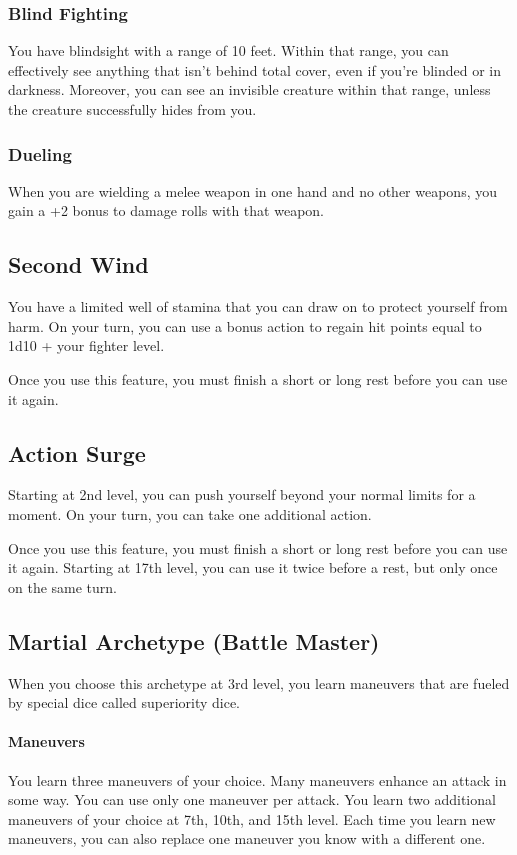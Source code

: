 {\subsubsection*{Blind Fighting}
You have blindsight with a range of 10 feet. Within that range, you can effectively see anything that isn't behind total cover, even if you're blinded or in darkness. Moreover, you can see an invisible creature within that range, unless the creature successfully hides from you.
\subsubsection*{Dueling}
When you are wielding a melee weapon in one hand and no other weapons, you gain a +2 bonus to damage rolls with that weapon.
\subsection*{Second Wind}
You have a limited well of stamina that you can draw on to protect yourself from harm. On your turn, you can use a bonus action to regain hit points equal to 1d10 + your fighter level.

Once you use this feature, you must finish a short or long rest before you can use it again.
\subsection*{Action Surge}
Starting at 2nd level, you can push yourself beyond your normal limits for a moment. On your turn, you can take one additional action.

Once you use this feature, you must finish a short or long rest before you can use it again. Starting at 17th level, you can use it twice before a rest, but only once on the same turn.
\subsection*{Martial Archetype (Battle Master)}
When you choose this archetype at 3rd level, you learn maneuvers that are fueled by special dice called superiority dice.
\paragraph*{Maneuvers} You learn three maneuvers of your choice. Many maneuvers enhance an attack in some way. You can use only one maneuver per attack. You learn two additional maneuvers of your choice at 7th, 10th, and 15th level. Each time you learn new maneuvers, you can also replace one maneuver you know with a different one.
}
